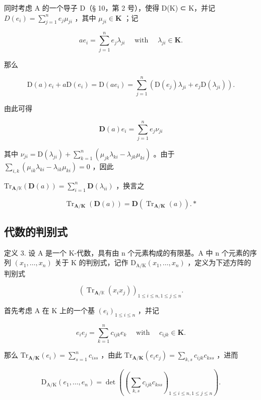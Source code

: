 同时考虑 A 的一个导子 D（§ 10，第 2 号），使得 D(K) ⊂ K，并记 \(D (e _ {i}) = \sum_ {j = 1} ^ {n} e _ {j} \mu_ {j i}\) ，其中 \(\mu_ {j i} \in \mathbf {K}\) ；记

\[
a e _ {i} = \sum_ {j = 1} ^ {n} e _ {j} \lambda_ {j i} \quad \text { with } \quad \lambda_ {j i} \in \mathbf {K}.
\]

那么

\[
\mathrm{D} (a) e _ {i} + a \mathrm{D} (e _ {i}) = \mathrm{D} (a e _ {i}) = \sum_ {j = 1} ^ {n} (\mathrm{D} (e _ {j}) \lambda_ {j i} + e _ {j} \mathrm{D} (\lambda_ {j i})).
\]

由此可得

\[
\mathbf {D} (a) e _ {i} = \sum_ {j = 1} ^ {n} e _ {j} \nu_ {j i}
\]

其中 \(\nu_{ji} = \mathrm{D}(\lambda_{ji}) + \sum_{k=1}^{n} (\mu_{jk}\lambda_{ki} - \lambda_{jk}\mu_{ki})\) 。由于 \(\sum_{i,k} (\mu_{ik}\lambda_{ki} - \lambda_{ik}\mu_{ki}) = 0\) ，因此

 \(\mathrm{Tr}_{\mathbf{A} / \mathbb{K}}(\mathbf{D}(a)) = \sum_{i = 1}^{n}\mathbf{D}(\lambda_{ii})\) ，换言之

\[
\operatorname{Tr} _ {\mathbf {A} / \mathbf {K}} (\mathbf {D} (a)) = \mathbf {D} (\operatorname{Tr} _ {\mathbf {A} / \mathbf {K}} (a)). *\tag{29}
\]

\subsection{代数的判别式}

定义 3. 设 A 是一个 K-代数，具有由 n 个元素构成的有限基。A 中 n 个元素的序列 \((x_{1},\ldots,x_{n})\) 关于 K 的判别式，记作 \(\mathrm{D}_{\mathrm{A}/\mathrm{K}}(x_{1},\ldots,x_{n})\) ，定义为下述方阵的判别式

\[
\left(\operatorname{Tr} _ {\mathbf {A} / \mathbb {K}} \left(x _ {i} x _ {j}\right)\right) _ {1 \leqslant i \leqslant n, 1 \leqslant j \leqslant n}.
\]

首先考虑 A 在 K 上的一个基 \((e_i)_{1\leqslant i\leqslant n}\) ，并记

\[
e _ {i} e _ {j} = \sum_ {k = 1} ^ {n} c _ {i j k} e _ {k} \quad \text { with } \quad c _ {i j k} \in \mathbf {K}.\tag{30}
\]

那么 \(\mathrm{Tr}_{\mathbf{A} / \mathbf{K}}(e_i) = \sum_{s=1}^{n} c_{iss}\) ，由此 \(\mathrm{Tr}_{\mathbf{A} / \mathbf{K}}(e_i e_j) = \sum_{k,s} c_{ijk} c_{kss}\) ，进而

\[
\mathrm{D} _ {\mathrm{A} / \mathrm{K}} (e _ {1}, \dots , e _ {n}) = \det \left(\left(\sum_ {k, s} c _ {i j k} c _ {k s s}\right) _ {1 \leqslant i \leqslant n, 1 \leqslant j \leqslant n}\right).\tag{31}
\]

